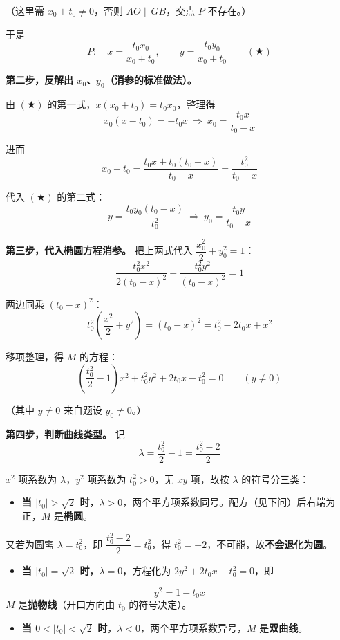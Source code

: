 \begin{answer}
（这里需 $x_0+t_0\ne0$，否则 $AO\parallel GB$，交点 $P$ 不存在。）

于是
\nopagebreak[4]
\[P:\quad x=\frac{t_0x_0}{x_0+t_0},\qquad y=\frac{t_0y_0}{x_0+t_0}\qquad(\bigstar)\]

\textbf{第二步，反解出 $x_0$、$y_0$（消参的标准做法）。}

由 $(\bigstar)$ 的第一式，$x\left(x_0+t_0\right)=t_0x_0$，整理得
\nopagebreak[4]
\[x_0\left(x-t_0\right)=-t_0x\ \Longrightarrow\ x_0=\frac{t_0x}{t_0-x}\]

进而
\nopagebreak[4]
\[x_0+t_0=\frac{t_0x+t_0\left(t_0-x\right)}{t_0-x}=\frac{t_0^2}{t_0-x}\]

代入 $(\bigstar)$ 的第二式：
\nopagebreak[4]
\[y=\frac{t_0y_0\left(t_0-x\right)}{t_0^2}\ \Longrightarrow\ y_0=\frac{t_0y}{t_0-x}\]

\textbf{第三步，代入椭圆方程消参。} 把上两式代入 $\dfrac{x_0^2}{2}+y_0^2=1$：
\nopagebreak[4]
\[\frac{t_0^2x^2}{2\left(t_0-x\right)^2}+\frac{t_0^2y^2}{\left(t_0-x\right)^2}=1\]

两边同乘 $\left(t_0-x\right)^2$：
\nopagebreak[4]
\[t_0^2\left(\frac{x^2}{2}+y^2\right)=\left(t_0-x\right)^2=t_0^2-2t_0x+x^2\]

移项整理，得 $M$ 的方程：
\nopagebreak[4]
\[\boxed{\left(\frac{t_0^2}{2}-1\right)x^2+t_0^2y^2+2t_0x-t_0^2=0\qquad(y\ne0)}\]

（其中 $y\ne0$ 来自题设 $y_0\ne0$。）

\textbf{第四步，判断曲线类型。} 记
\nopagebreak[4]
\[\lambda=\frac{t_0^2}{2}-1=\frac{t_0^2-2}{2}\]

$x^2$ 项系数为 $\lambda$，$y^2$ 项系数为 $t_0^2>0$，无 $xy$ 项，故按 $\lambda$ 的符号分三类：

\begin{itemize}
\item \textbf{当 $\left|t_0\right|>\sqrt2$ 时}，$\lambda>0$，两个平方项系数同号。配方（见下问）后右端为正，$M$ 是\textbf{椭圆}。
\end{itemize}
  又若为圆需 $\lambda=t_0^2$，即 $\dfrac{t_0^2-2}{2}=t_0^2$，得 $t_0^2=-2$，不可能，故\textbf{不会退化为圆}。
\begin{itemize}
\item \textbf{当 $\left|t_0\right|=\sqrt2$ 时}，$\lambda=0$，方程化为 $2y^2+2t_0x-t_0^2=0$，即
\end{itemize}
\nopagebreak[4]
\[y^2=1-t_0x\]
  $M$ 是\textbf{抛物线}（开口方向由 $t_0$ 的符号决定）。
\begin{itemize}
\item \textbf{当 $0<\left|t_0\right|<\sqrt2$ 时}，$\lambda<0$，两个平方项系数异号，$M$ 是\textbf{双曲线}。
\end{itemize}


\end{answer}
